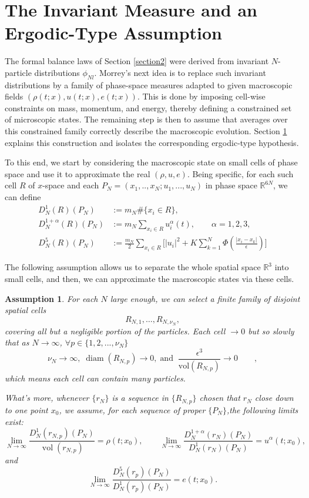 \documentclass[11pt]{article}
\newtheorem{assumption}{Assumption}
\begin{document}
\section{The Invariant Measure and an Ergodic-Type Assumption}\label{section3}

The formal balance laws of Section \ref{section2} were derived from invariant $N$-particle distributions $\phi_{Nl}$. Morrey's next idea is to replace such invariant distributions by a family of phase-space measures adapted to given macroscopic fields $(\rho(t;x),u(t;x),e(t;x))$. This is done by imposing cell-wise constraints on mass, momentum, and energy, thereby defining a constrained set of microscopic states. The remaining step is then to assume that averages over this constrained family correctly describe the macroscopic evolution. Section \ref{section3} explains this construction and isolates the corresponding ergodic-type hypothesis.

To this end, we start by considering the macroscopic state on small cells of phase space and use it to approximate the real $(\rho,u,e)$. Being specific, for each such cell $R$ of $x$-space and each $P_N=(x_1,..,x_N;u_1,...,u_N)$ in phase space $\mathbb{R}^{6N}$, we can define
\begin{align*}\label{3.0}
D_N^1(R)(P_N) &:= m_N \#\{x_i\in R\}, 
\\
D_N^{1+\alpha}(R)(P_N) &:= m_N \sum_{x_i\in R} u_i^\alpha(t), \qquad \alpha = 1,2,3, 
\\
D_N^5(R)(P_N) &:=\frac{m_N}{2} \sum_{x_i\in R}\Big[ |u_i|^2 + K\sum_{k=1}^N \Phi(\frac{|x_i - x_k|}{\epsilon}) \Big]
\end{align*}


The following assumption allows us to separate the whole spatial space $\mathbb{R}^3$ into small cells, and then, we can approximate the macroscopic states via these cells.

\begin{assumption}\label{assump:R_N}
For each $N$ large enough, we can select a finite family of disjoint spatial cells
\[
R_{N,1},\dots,R_{N,\nu_N},
\]
covering all but a negligible portion of the particles.  
Each cell $\rightarrow0$ but so slowly that as $N\to\infty$,  $\forall p\in\{1,2,...,\nu_N\}$
\[
\nu_N \to \infty,\; \operatorname{diam}(R_{N,p})\to 0,\;\text{and}\;\; \frac{\epsilon^3}{\mathrm{vol}(R_{N,p})} \to 0 \qquad,
\]
which means each cell can contain many particles. 

What's more, whenever $\{r_N\}$ is a sequence in $\{R_{N,p}\}$ chosen that $r_N$ close down to one point $x_0$, we assume, for each sequence of proper $\{P_N\}$,the following limits exist:  
\begin{equation*}
\lim_{N\rightarrow \infty}\frac{D^1_N(r_{N,p})(P_N)}{\operatorname{vol}(r_{N,p})}
=\rho(t;x_0),
\qquad
\lim_{N\rightarrow \infty}\frac{D_N^{1+\alpha}(r_N)(P_N)}{D_N^1(r_N)(P_N)}
=u^\alpha(t;x_0),
\end{equation*}
and
\[
\lim_{N\rightarrow \infty}\frac{D^5_N(r_p)(P_N)}{D^1_N(r_p)(P_N)}
=e(t;x_0).
\]

\end{assumption} 
\end{document}
